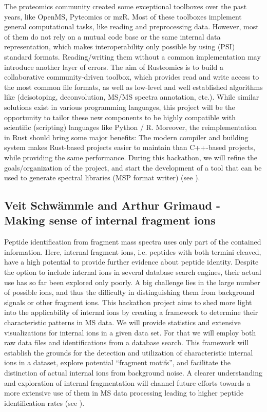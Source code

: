 The proteomics community created some exceptional toolboxes over the past years, like OpenMS, Pyteomics or mzR. Most of these toolboxes implement general computational tasks, like reading and preprocessing data. However, most of them do not rely on a mutual code base or the same internal data representation, which makes interoperability only possible by using (PSI) standard formats. Reading/writing them without a common implementation may introduce another layer of errors.
The aim of Rusteomics is to build a collaborative community-driven toolbox, which provides read and write access to the most common file formats, as well as low-level and well established algorithms like (deisotoping, deconvolution, MS/MS spectra annotation, etc.).
While similar solutions exist in various programming languages, this project will be the opportunity to tailor these new components to be highly compatible with scientific (scripting) languages like Python / R. Moreover, the reimplementation in Rust should bring some major benefits: The modern compiler and building system makes Rust-based projects easier to maintain than C++-based projects, while providing the same performance.
During this hackathon, we will refine the goals/organization of the project, and start the development of a tool that can be used to generate spectral libraries (MSP format writer) (see \cite{issue10}).

\subsection{Veit Schwämmle and Arthur Grimaud - Making sense of internal fragment ions}

Peptide identification from fragment mass spectra uses only part of the contained information. Here, internal fragment ions, i.e. peptides with both termini cleaved, have a high potential to provide further evidence about peptide identity. Despite the option to include internal ions in several database search engines, their actual use has so far been explored only poorly. A big challenge lies in the large number of possible ions, and thus the difficulty in distinguishing them from background signals or other fragment ions. This hackathon project aims to shed more light into the applicability of internal ions by creating a framework to determine their characteristic patterns in MS data. We will provide statistics and extensive visualizations for internal ions in a given data set. For that we will employ both raw data files and identifications from a database search. This framework will establish the grounds for the detection and utilization of characteristic internal ions in a dataset, explore potential “fragment motifs”, and facilitate the distinction of actual internal ions from background noise. A clearer understanding and exploration of internal fragmentation will channel future efforts towards a more extensive use of them in MS data processing leading to higher peptide identification rates (see \citep{issue9}).


